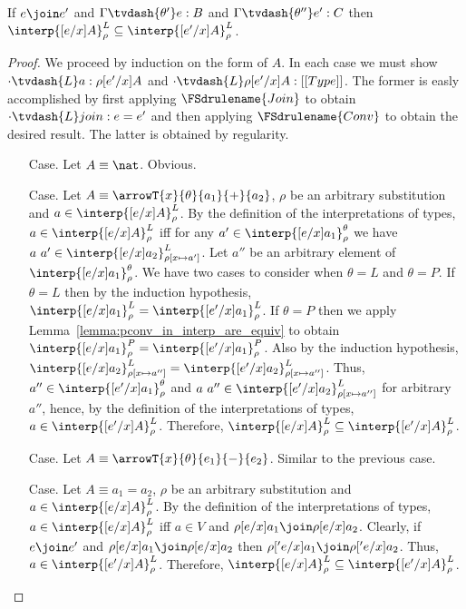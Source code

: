 \begin{lemma}
  \label{lemma:lconv_in_interp_are_equiv}
  If $e \join e'$ and $\Gamma \tvdash{\theta'} e:B$ and $\Gamma \tvdash{\theta''} e':C$ then 
  $\interp{[e/x]A}^L_\rho \subseteq \interp{[e'/x]A}^L_\rho$.
\end{lemma}
\begin{proof}
  We proceed by induction on the form of $A$.  In each case we must show 
  $\cdot \tvdash{L} a:\rho[e'/x]A$ and $\cdot \tvdash{L} \rho[e'/x]A:[[Type]]$.  The former is easly 
  accomplished by first applying $\FSdrulename{Join}$ to obtain $\cdot \tvdash{L} join:e = e'$ 
  and then applying $\FSdrulename{Conv}$ to obtain the desired result.  The latter is obtained
  by regularity.
  
  \begin{itemize}
  \item[Case.] Let $A \equiv \nat$.  Obvious.
    
  \item[Case.] Let $A \equiv \arrowT{x}{\theta}{a_1}{+}{a_2}$, $\rho$ be an arbitrary 
    substitution and $a \in \interp{[e/x]A}^L_\rho$.  By the definition of the interpretations 
    of types,
    $a \in \interp{[e/x]A}^L_\rho$ iff for any 
    $a' \in \interp{[e/x]a_1}^\theta_\rho$ we have
    $a\ a' \in \interp{[e/x]a_2}^L_{\rho[x \mapsto a']}$.
    Let $a''$ be an arbitrary element of $\interp{[e/x]a_1}^\theta_\rho$. We have two cases
    to consider when $\theta = L$ and $\theta = P$.  If $\theta = L$ then by the induction 
    hypothesis, 
    $\interp{[e/x]a_1}^L_\rho = \interp{[e'/x]a_1}^L_\rho$.  
    If $\theta = P$ then we apply  
    Lemma~\ref{lemma:pconv_in_interp_are_equiv} to obtain 
    $\interp{[e/x]a_1}^P_\rho = \interp{[e'/x]a_1}^P_\rho$.
    Also by the induction hypothesis,
    $\interp{[e/x]a_2}^L_{\rho[x \mapsto a'']} = \interp{[e'/x]a_2}^L_{\rho[x \mapsto a'']}$.  
    Thus, 
    $a'' \in \interp{[e'/x]a_1}^\theta_\rho$ and
    $a\ a'' \in \interp{[e'/x]a_2}^L_{\rho[x \mapsto a'']}$ for arbitrary $a''$, hence,
    by the definition of the interpretations of types,
    $a \in \interp{[e'/x]A}^L_\rho$.  Therefore, 
    $\interp{[e/x]A}^L_\rho \subseteq \interp{[e'/x]A}^L_\rho$.
    
  \item[Case.]  Let $A \equiv \arrowT{x}{\theta}{e_1}{-}{e_2}$.  Similar to the previous case.
    
  \item[Case.] Let $A \equiv a_1 = a_2$, $\rho$ be an arbitrary 
    substitution and $a \in \interp{[e/x]A}^L_\rho$.
    By the definition of the interpretations of types,
    $a \in \interp{[e/x]A}^L_\rho$ iff $a \in V$ and 
    $\rho[e/x]a_1 \join \rho[e/x]a_2$.
    Clearly, if $e \join e'$ and $\rho[e/x]a_1 \join \rho[e/x]a_2$ then 
    $\rho['e/x]a_1 \join \rho['e/x]a_2$.
    Thus, $a \in \interp{[e'/x]A}^L_\rho$.  Therefore,
    $\interp{[e/x]A}^L_\rho \subseteq \interp{[e'/x]A}^L_\rho$.
  \end{itemize}
\end{proof}


